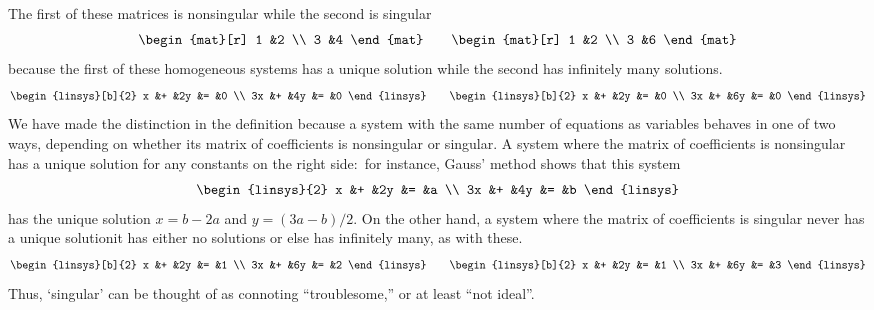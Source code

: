 \begin{example}
The first of these matrices is nonsingular while the second is singular
\begin{equation*}
  \begin{mat}[r]
    1  &2  \\
    3  &4
  \end{mat}
  \qquad
  \begin{mat}[r]
    1  &2  \\
    3  &6
  \end{mat}
\end{equation*}
because the first of these homogeneous systems has a unique solution 
while the second has infinitely many solutions.
\begin{equation*}
  \begin{linsys}[b]{2}
    x &+  &2y  &=  &0  \\
   3x &+  &4y  &=  &0  
  \end{linsys}
  \qquad
  \begin{linsys}[b]{2}
    x &+  &2y  &=  &0  \\
   3x &+  &6y  &=  &0
  \end{linsys}
\end{equation*}  
We have made the distinction in the definition because a system
with the same number of equations as variables
behaves in one of two ways, depending on whether its matrix of coefficients
is nonsingular or singular.
A system where the matrix of coefficients is nonsingular 
has a unique solution for any constants on the right 
side:~for instance, Gauss' method shows that this system
\begin{equation*}
  \begin{linsys}{2}
    x  &+  &2y  &=  &a \\
    3x &+  &4y  &=  &b
  \end{linsys}
\end{equation*}
has the unique solution $x=b-2a$ and  $y=(3a-b)/2$.
On the other hand, a system where the matrix of coefficients is
singular never has a unique solution\Dash it 
has either no solutions or else has infinitely many, as with these.
\begin{equation*}
  \begin{linsys}[b]{2}
    x  &+  &2y  &=   &1   \\
   3x  &+  &6y  &=   &2   
  \end{linsys}
  \qquad
  \begin{linsys}[b]{2}
    x  &+  &2y  &=   &1   \\
   3x  &+  &6y  &=   &3
  \end{linsys}
\end{equation*} 
Thus, `singular' can be thought of as connoting 
``troublesome,'' or at least ``not ideal''.
\end{example}

